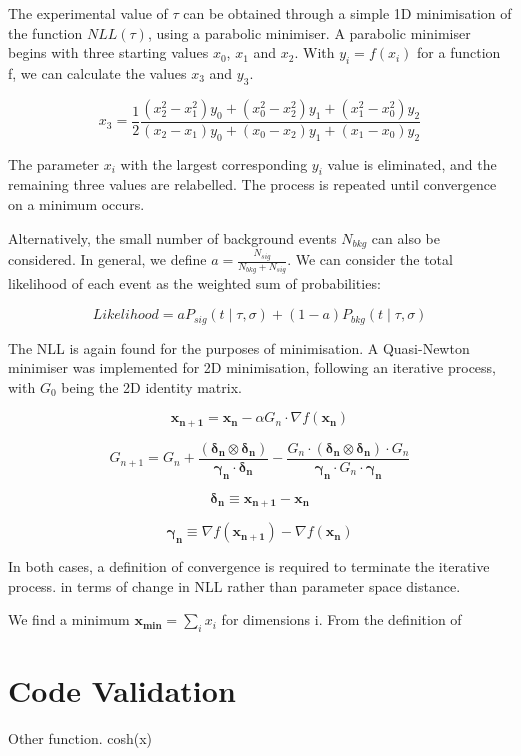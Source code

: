 \documentclass{article}
\begin{document}
The experimental value of $\tau$ can be obtained through a simple 1D minimisation of the function $NLL(\tau)$, using a parabolic minimiser. A parabolic minimiser begins with three starting values $x_{0}$, $x_{1}$ and $x_{2}$. With $y_{i} = f(x_{i})$ for a function f, we can calculate the values $x_{3}$ and $y_{3}$.

\[x_{3} = \frac{1}{2} \frac{(x_{2}^{2}-x_{1}^{2})y_{0} + (x_{0}^{2}-x_{2}^{2})y_{1} + (x_{1}^{2}-x_{0}^{2})y_{2}}{(x_{2}-x_{1})y_{0} + (x_{0}-x_{2})y_{1} + (x_{1}-x_{0})y_{2}}\] 

The parameter $x_{i}$ with the largest corresponding $y_{i}$ value is eliminated, and the remaining three values are relabelled. The process is repeated until convergence on a minimum occurs. 

Alternatively, the small number of background events $N_{bkg}$ can also be considered. In general, we define $a = \frac{N_{sig}}{N_{bkg}+N_{sig}}$. We can consider the total likelihood of each event as the weighted sum of probabilities: 

\[ Likelihood = a P_{sig}(t \mid \tau, \sigma)  + (1-a) P_{bkg}(t \mid \tau, \sigma) \]

The NLL is again found for the purposes of minimisation. A Quasi-Newton minimiser was implemented for 2D minimisation, following an iterative process, with $G_{0}$ being the 2D identity matrix.

\[ \mathbf{x_{n+1}} = \mathbf{x_{n}} - \alpha G_{n} \cdot \nabla f(\mathbf{x_{n}}) \]

\[ G_{n+1} = G_{n} + \frac{(\mathbf{\delta_{n}} \otimes \mathbf{\delta_{n}})}{\mathbf{\gamma_{n}} \cdot \mathbf{\delta_{n}}} - \frac{G_{n} \cdot (\mathbf{\delta_{n}} \otimes \mathbf{\delta_{n}}) \cdot G_{n}}{\mathbf{\gamma_{n}} \cdot G_{n} \cdot \mathbf{\gamma_{n}}}\]

\[ \mathbf{\delta_{n}} \equiv \mathbf{x_{n+1}} - \mathbf{x_{n}} \]

\[ \mathbf{\gamma_{n}} \equiv \nabla f(\mathbf{x_{n+1}}) - \nabla f(\mathbf{x_{n}}) \]

In both cases, a definition of convergence is required to terminate the iterative process. in terms of change in NLL rather than parameter space distance. 

We find a minimum $\mathbf{x_{min}} = \sum_{i} x_{i}$ for dimensions i. From the definition of  

\section{Code Validation}
Other function. cosh(x)
\end{document}
